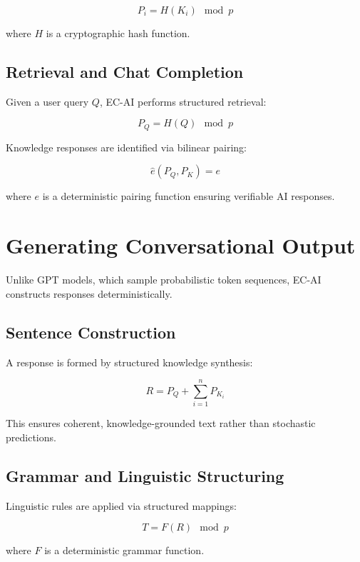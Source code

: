 \documentclass{article}
\begin{document}
\begin{equation}
P_i = H(K_i) \mod p
\end{equation}

where $H$ is a cryptographic hash function.

\subsection{Retrieval and Chat Completion}

Given a user query $Q$, EC-AI performs structured retrieval:

\begin{equation}
P_Q = H(Q) \mod p
\end{equation}

Knowledge responses are identified via bilinear pairing:

\begin{equation}
\hat{e}(P_Q, P_K) = e
\end{equation}

where $e$ is a deterministic pairing function ensuring verifiable AI responses.

\section{Generating Conversational Output}
Unlike GPT models, which sample probabilistic token sequences, EC-AI constructs responses deterministically.

\subsection{Sentence Construction}
A response is formed by structured knowledge synthesis:

\begin{equation}
R = P_Q + \sum_{i=1}^{n} P_{K_i}
\end{equation}

This ensures coherent, knowledge-grounded text rather than stochastic predictions.

\subsection{Grammar and Linguistic Structuring}
Linguistic rules are applied via structured mappings:

\begin{equation}
T = F(R) \mod p
\end{equation}

where $F$ is a deterministic grammar function.
\end{document}
